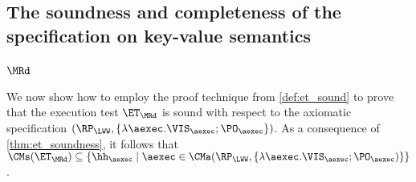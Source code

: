 \subsection{The soundness and completeness of the specification on  key-value semantics}
\label{sec:kv-sound-complete-proof}

\subsubsection{\( \MRd \)}

\label{sec:sound-complete-mr}

We now show how to employ the proof technique from \cref{def:et_sound} to prove that the execution 
test $\ET_\MRd$ is sound with respect to the axiomatic specification $(\RP_{\LWW}, \{\lambda \aexec. \VIS_{\aexec} ; \PO_{\aexec} \})$. 
As a consequence of \cref{thm:et_soundness}, it follows that $\CMs(\ET_{\MRd}) \subseteq \{ \hh_{\aexec} \mid \aexec \in \CMa(\RP_{\LWW}, 
\{\lambda \aexec. \VIS_{\aexec} ; \PO_{\aexec})\} \}$. 

